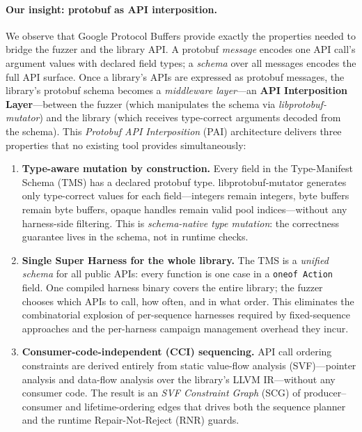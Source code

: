 \documentclass[sigconf,anonymous]{acmart}
\begin{document}
\paragraph{Our insight: protobuf as API interposition.}
We observe that Google Protocol Buffers provide exactly the properties
needed to bridge the fuzzer and the library API.  A protobuf
\emph{message} encodes one API call's argument values with declared
field types; a \emph{schema} over all messages encodes the full API
surface.  Once a library's APIs are expressed as protobuf messages, the
library's protobuf schema becomes a \emph{middleware layer}---an
\textbf{API Interposition Layer}---between the fuzzer (which manipulates
the schema via \textit{libprotobuf-mutator}) and the library (which
receives type-correct arguments decoded from the schema).
This \emph{Protobuf API Interposition} (PAI) architecture delivers three
properties that no existing tool provides simultaneously:

\begin{enumerate}[leftmargin=*, label=(\roman*)]

\item \textbf{Type-aware mutation by construction.}
  Every field in the Type-Manifest Schema (TMS) has a declared protobuf
  type.  libprotobuf-mutator generates only type-correct values for each
  field---integers remain integers, byte buffers remain byte buffers,
  opaque handles remain valid pool indices---without any harness-side
  filtering.  This is \emph{schema-native type mutation}: the
  correctness guarantee lives in the schema, not in runtime checks.

\item \textbf{Single Super Harness for the whole library.}
  The TMS is a \emph{unified schema} for all public APIs: every function
  is one case in a \texttt{oneof Action} field.  One compiled harness
  binary covers the entire library; the fuzzer chooses which APIs to
  call, how often, and in what order.  This eliminates the
  combinatorial explosion of per-sequence harnesses required by fixed-sequence
  approaches and the per-harness campaign management overhead they incur.

\item \textbf{Consumer-code-independent (CCI) sequencing.}
  API call ordering constraints are derived entirely from static
  value-flow analysis (SVF)---pointer analysis and data-flow analysis
  over the library's LLVM IR---without any consumer code.  The result is
  an \emph{SVF Constraint Graph} (SCG) of producer--consumer and
  lifetime-ordering edges that drives both the sequence planner and the
  runtime Repair-Not-Reject (RNR) guards.

\end{enumerate}
\end{document}
